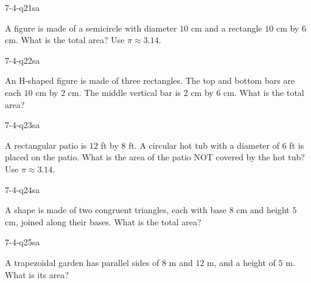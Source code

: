 \begin{practiceQuestion}{7-4-q21}{sa}
\begin{questionText}
A figure is made of a semicircle with diameter $10$ cm and a rectangle $10$ cm by $6$ cm. What is the total area? Use $\pi \approx 3.14$.
\end{questionText}
\end{practiceQuestion}

\begin{practiceQuestion}{7-4-q22}{sa}
\begin{questionText}
An H-shaped figure is made of three rectangles. The top and bottom bars are each $10$ cm by $2$ cm. The middle vertical bar is $2$ cm by $6$ cm. What is the total area?
\end{questionText}
\end{practiceQuestion}

\begin{practiceQuestion}{7-4-q23}{sa}
\begin{questionText}
A rectangular patio is $12$ ft by $8$ ft. A circular hot tub with a diameter of $6$ ft is placed on the patio. What is the area of the patio NOT covered by the hot tub? Use $\pi \approx 3.14$.
\end{questionText}
\end{practiceQuestion}

\begin{practiceQuestion}{7-4-q24}{sa}
\begin{questionText}
A shape is made of two congruent triangles, each with base $8$ cm and height $5$ cm, joined along their bases. What is the total area?
\end{questionText}
\end{practiceQuestion}

\begin{practiceQuestion}{7-4-q25}{sa}
\begin{questionText}
A trapezoidal garden has parallel sides of $8$ m and $12$ m, and a height of $5$ m. What is its area?
\end{questionText}
\end{practiceQuestion}

